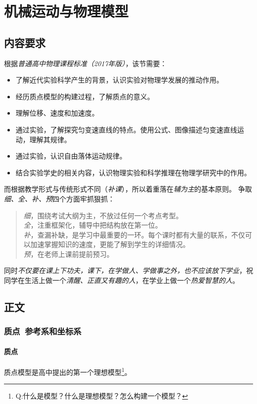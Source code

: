\chapter{机械运动与物理模型}
	\section{内容要求}
		根据\emph{普通高中物理课程标准（2017年版）}，该节需要：

		\begin{itemize}
			\item 了解近代实验科学产生的背景，认识实验对物理学发展的推动作用。
			\item 经历质点模型的构建过程，了解质点的意义。
			\item 理解位移、速度和加速度。
			\item 通过实验，了解探究匀变速直线的特点。使用公式、图像描述匀变速直线运动，理解其规律。
			\item 通过实验，认识自由落体运动规律。
			\item 结合实验学史的相关内容，认识物理实验和科学推理在物理学研究中的作用。
		\end{itemize}

		而根据教学形式与传统形式不同（\emph{补课}），所以着重落在\emph{辅为主}的基本原则。%
		争取\emph{细、全、补、预}四个方面牢抓狠抓：
		\begin{verse}
			\emph{细}，围绕考试大纲为主，不放过任何一个考点考型。\\
			\emph{全}，注重框架化，辅导中把结构放在第一位。\\
			\emph{补}，查漏补缺，是学习中最重要的一环。每个课时都有大量的联系，不仅可以加速掌握知识的速度，更能了解到学生的详细情况。\\
			\emph{预}，在老师上课前提前预习。
		\end{verse}

		同时\emph{不仅要在课上下功夫，课下，在学做人、学做事之外，也不应该放下学业}，祝同学在生活上做一个\emph{清醒、正直又有趣的人}，在学业上做一个\emph{热爱智慧的人}。
	
	\section{正文}
		\subsection{质点\ 参考系和坐标系}
			\subsubsection*{质点}
				质点模型是高中提出的第一个理想模型\footnote{Q:什么是模型？什么是理想模型？怎么构建一个模型？}。
				
